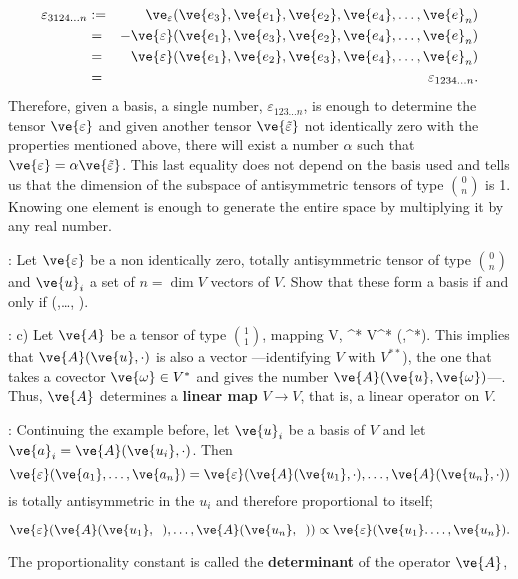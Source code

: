 \begin{eqnarray*} 
\varepsilon_{3124\ldots n} &:=& \ve_{\varepsilon}(\ve{e_3},\ve{e_1}, \ve{e_{2}}, \ve{e_{4}},\ldots,\ve{e}_n) \\
&=& -\ve{\varepsilon}(\ve{e_1},\ve{e_3}, \ve{e_{2}}, \ve{e_{4}},\ldots,\ve{e}_n) \\ 
&=& \ve{\varepsilon}(\ve{e_1},\ve{e_2}, \ve{e_{3}}, \ve{e_{4}},\ldots,\ve{e}_n) \\
&=&\varepsilon_{1234\ldots n}. 
\end{eqnarray*} 
% 
Therefore, given a basis, a single number, $\varepsilon_{123\ldots n}$, is enough to determine the tensor $\ve{\varepsilon}$ and given another tensor $\ve{\tilde{\varepsilon} }$ not identically zero with the properties mentioned above, there will exist a number $\alpha$ such that $\ve{\varepsilon} = \alpha\ve{\tilde{\varepsilon}}$. This last equality does not depend on the basis used and tells us that the dimension of the subspace of antisymmetric tensors of type ${0 \choose n}$ is 1. Knowing one element is enough to generate the entire space by multiplying it by any real number.

\ejer: Let $\ve{\varepsilon}$ be a non identically zero, totally antisymmetric tensor of type ${0 \choose n}$ and ${\ve{u}_i}$ a set of $n=\dim V$ vectors of $V$. Show that these form a basis if and only if 
\beq 
\ve{\varepsilon} (,\ldots, ). 
\eeq

\ejem: c) Let $\ve{ A}$ be a tensor of type ${1 \choose 1}$, mapping
\beq
{}\in V, \;\; ^* \in V^* \to {}(,^*)\in\re. 
\eeq 
This implies that $\ve{A}(\ve{u},\cdot)$ is also a vector ---identifying $V$ with $V^{**}$), the one that takes a covector $\ve{\omega} \in V^*$ and gives the number $\ve{A}(\ve{u},\ve{\omega})$---. 
Thus, $\ve{A}$ determines a \textbf{linear map} $V \to V$, that is, a linear operator on $V$.

\ejer: Continuing the example before, let ${\ve{u}_i}$ be a basis of $V$ and let $\ve{ a}_i = \ve{A}(\ve{u_i},\cdot)$. Then $$ \ve{\varepsilon}(\ve{a_1},\ldots,\ve{a_n})=\ve{\varepsilon}(\ve{A}(\ve{u_1}, \cdot),\ldots ,\ve{A}(\ve{u_n},\cdot)) $$ is totally antisymmetric in the ${u_i}$ and therefore proportional to itself;

\[ 
\ve{\varepsilon}(\ve{A}(\ve{u_1},\;\;),\ldots ,\ve{A}(\ve{u_n},\;\;)) \propto \ve{\varepsilon}(\ve{u_1}. \ldots, \ve{u_n}). 
\] %

The proportionality constant is called the {\bf determinant}  of the operator $\ve{A}$,

